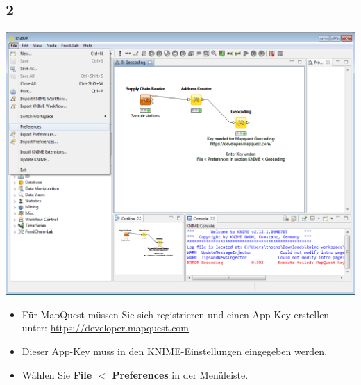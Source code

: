 \documentclass{beamer}
\begin{document}
\subsection{2}
\begin{frame}
	\begin{center}
  		\includegraphics[height=0.6\textheight]{2.png}
	\end{center}
	\begin{itemize}		
		\item Für MapQuest müssen Sie sich registrieren und einen App-Key erstellen unter: \url{https://developer.mapquest.com}
		\item Dieser App-Key muss in den KNIME-Einstellungen eingegeben werden.
		\item Wählen Sie \textbf{File $<$ Preferences} in der Menüleiste.
	\end{itemize}
\end{frame}
\end{document}
